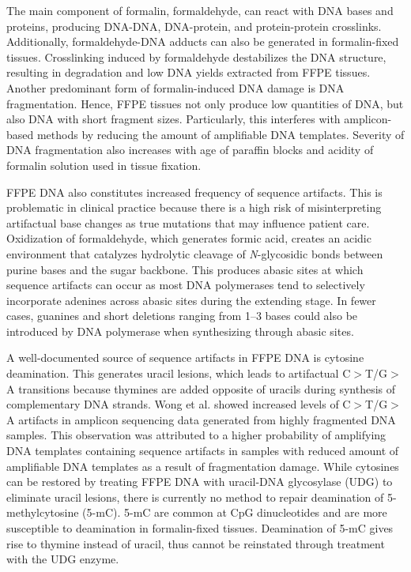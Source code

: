 The main component of formalin, formaldehyde, can react with DNA bases and proteins, producing DNA-DNA, DNA-protein, and protein-protein crosslinks. Additionally, formaldehyde-DNA adducts can also be generated in formalin-fixed tissues. Crosslinking induced by formaldehyde destabilizes the DNA structure, resulting in degradation and low DNA yields extracted from FFPE tissues. Another predominant form of formalin-induced DNA damage is DNA fragmentation. Hence, FFPE tissues not only produce low quantities of DNA, but also DNA with short fragment sizes. Particularly, this interferes with amplicon-based methods by reducing the amount of amplifiable DNA templates. Severity of DNA fragmentation also increases with age of paraffin blocks and acidity of formalin solution used in tissue fixation.

FFPE DNA also constitutes increased frequency of sequence artifacts. This is problematic in clinical practice because there is a high risk of misinterpreting artifactual base changes as true mutations that may influence patient care. Oxidization of formaldehyde, which generates formic acid, creates an acidic environment that catalyzes hydrolytic cleavage of \textit{N}-glycosidic bonds between purine bases and the sugar backbone. This produces abasic sites at which sequence artifacts can occur as most DNA polymerases tend to selectively incorporate adenines across abasic sites during the extending stage. In fewer cases, guanines and short deletions ranging from 1--3 bases could also be introduced by DNA polymerase when synthesizing through abasic sites.

A well-documented source of sequence artifacts in FFPE DNA is cytosine deamination. This generates uracil lesions, which leads to artifactual C$>$T/G$>$A transitions because thymines are added opposite of uracils during synthesis of complementary DNA strands. Wong et al. \cite{Wong2014} showed increased levels of C$>$T/G$>$A artifacts in amplicon sequencing data generated from highly fragmented DNA samples. This observation was attributed to a higher probability of amplifying DNA templates containing sequence artifacts in samples with reduced amount of amplifiable DNA templates as a result of fragmentation damage. While cytosines can be restored by treating FFPE DNA with uracil-DNA glycosylase (UDG) to eliminate uracil lesions, there is currently no method to repair deamination of 5-methylcytosine (5-mC). 5-mC are common at CpG dinucleotides and are more susceptible to deamination in formalin-fixed tissues. Deamination of 5-mC gives rise to thymine instead of uracil, thus cannot be reinstated through treatment with the UDG enzyme.

